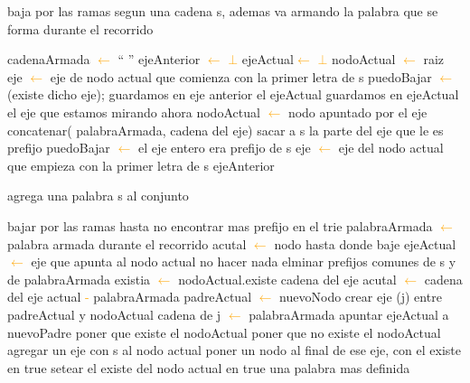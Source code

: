 \begin{algorithm}
\caption{baja por las ramas segun una cadena s, ademas va armando la palabra que se forma durante el recorrido }
\begin{algorithmic}[1]
\STATE cadenaArmada \textcolor{orange}{$\leftarrow$}  `` ''
\STATE ejeAnterior \textcolor{orange}{$\leftarrow$}  \textcolor{orange}{$\bot$}
\STATE ejeActual\textcolor{orange}{$\leftarrow$}  \textcolor{orange}{$\bot$}
\STATE nodoActual \textcolor{orange}{$\leftarrow$} raiz
\STATE eje \textcolor{orange}{$\leftarrow$} eje de nodo actual que comienza con la primer letra de s
\STATE puedoBajar \textcolor{orange}{$\leftarrow$} (existe dicho eje);
	\STATE guardamos en eje anterior el ejeActual
	\STATE guardamos en ejeActual el eje que estamos mirando ahora 
	\STATE nodoActual \textcolor{orange}{$\leftarrow$} nodo apuntado por el eje
	\STATE concatenar( palabraArmada, cadena del eje)
	\STATE sacar a s la parte del eje que le es prefijo
	\STATE puedoBajar \textcolor{orange}{$\leftarrow$} el eje entero era prefijo de s
	\STATE eje \textcolor{orange}{$\leftarrow$} eje del nodo actual que empieza con la primer letra de s
\ENDWHILE
\RETURN ejeAnterior
\label{alg:bajar}
\end{algorithmic}
\end{algorithm}	

\begin{algorithm}
\caption{agrega una palabra s al conjunto}
\begin{algorithmic}[1]
\STATE bajar por las ramas hasta no encontrar mas prefijo en el trie
\STATE palabraArmada \textcolor{orange}{$\leftarrow$} palabra armada durante el recorrido
\STATE acutal \textcolor{orange}{$\leftarrow$} nodo hasta donde baje
\STATE ejeActual \textcolor{orange}{$\leftarrow$} eje que apunta al nodo actual
	\STATE no hacer nada
\ELSE
	\STATE elminar prefijos comunes de s y de palabraArmada
		\STATE {} 
		\STATE existia \textcolor{orange}{$\leftarrow$} nodoActual.existe
		\STATE cadena del eje acutal \textcolor{orange}{$\leftarrow$} cadena del eje actual \textcolor{orange}{-} palabraArmada  
		\STATE padreActual \textcolor{orange}{$\leftarrow$} nuevoNodo 
		\STATE crear eje (j) entre padreActual y nodoActual
		\STATE cadena de j \textcolor{orange}{$\leftarrow$} palabraArmada
		\STATE apuntar ejeActual a nuevoPadre 
			\STATE poner que existe el nodoActual
		\ELSE
			\STATE poner que no existe el nodoActual
		\ENDIF
\ENDIF
\ENDIF
		\STATE agregar un eje con s al nodo actual
		\STATE poner un nodo al final de ese eje, con el existe en true
	\ELSE
		\STATE setear el existe del nodo actual en true
	\ENDIF
\STATE una palabra mas definida
\end{algorithmic}
\end{algorithm}


